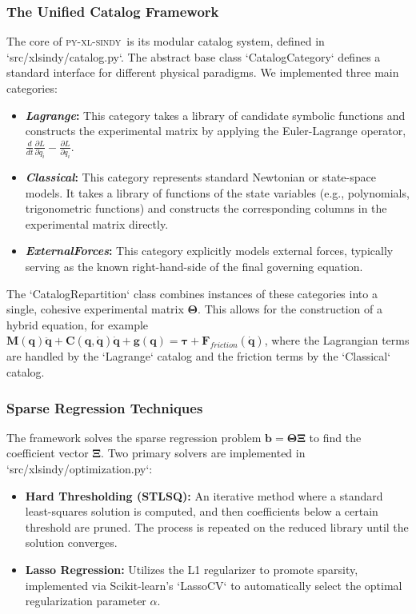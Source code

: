 \documentclass[12pt]{article}
\newcommand{\frameworkname}{\textsc{py-xl-sindy}}
\newcommand{\lagrangecat}{\textit{Lagrange}}
\newcommand{\classicalcat}{\textit{Classical}}
\newcommand{\forcescat}{\textit{ExternalForces}}
\begin{document}
\subsubsection*{The Unified Catalog Framework}
The core of \frameworkname\ is its modular catalog system, defined in `src/xlsindy/catalog.py`. The abstract base class `CatalogCategory` defines a standard interface for different physical paradigms. We implemented three main categories:
\begin{itemize}
    \item \textbf{\lagrangecat:} This category takes a library of candidate symbolic functions and constructs the experimental matrix by applying the Euler-Lagrange operator, $\frac{d}{dt}\frac{\partial L}{\partial \dot{q}_i} - \frac{\partial L}{\partial q_i}$.
    \item \textbf{\classicalcat:} This category represents standard Newtonian or state-space models. It takes a library of functions of the state variables (e.g., polynomials, trigonometric functions) and constructs the corresponding columns in the experimental matrix directly.
    \item \textbf{\forcescat:} This category explicitly models external forces, typically serving as the known right-hand-side of the final governing equation.
\end{itemize}
The `CatalogRepartition` class combines instances of these categories into a single, cohesive experimental matrix $\mathbf{\Theta}$. This allows for the construction of a hybrid equation, for example $\mathbf{M}(\mathbf{q})\ddot{\mathbf{q}} + \mathbf{C}(\mathbf{q},\dot{\mathbf{q}})\dot{\mathbf{q}} + \mathbf{g}(\mathbf{q}) = \mathbf{\tau} + \mathbf{F}_{friction}(\dot{\mathbf{q}})$, where the Lagrangian terms are handled by the `Lagrange` catalog and the friction terms by the `Classical` catalog.

\subsubsection*{Sparse Regression Techniques}
The framework solves the sparse regression problem $\mathbf{b} = \mathbf{\Theta}\mathbf{\Xi}$ to find the coefficient vector $\mathbf{\Xi}$. Two primary solvers are implemented in `src/xlsindy/optimization.py`:
\begin{itemize}
    \item \textbf{Hard Thresholding (STLSQ):} An iterative method where a standard least-squares solution is computed, and then coefficients below a certain threshold are pruned. The process is repeated on the reduced library until the solution converges.
    \item \textbf{Lasso Regression:} Utilizes the L1 regularizer to promote sparsity, implemented via Scikit-learn's `LassoCV` to automatically select the optimal regularization parameter $\alpha$.
\end{itemize}
\end{document}
